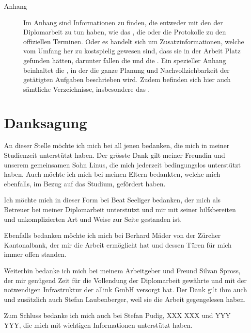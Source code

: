 \begin{description}
  \item[Anhang]
  
  Im Anhang sind Informationen zu finden, die entweder mit den
   der Diplomarbeit zu tun haben, wie das
  , die 
  oder die Protokolle zu den offiziellen Terminen. Oder es handelt sich um
  Zusatzinformationen, welche vom Umfang her zu kostspielig gewesen sind, dass
  sie in der Arbeit Platz gefunden hätten, darunter fallen die
   und die
  . Ein spezieller Anhang
  beinhaltet die , in der die ganze
  Planung und Nachvollziehbarkeit der getätigten Aufgaben beschrieben wird.
  Zudem befinden sich hier auch sämtliche Verzeichnisse, insbesondere das
  \bibname.
  
  \end{description}
  
  \section{Danksagung}
  
  An dieser Stelle möchte ich mich bei all jenen bedanken, die mich in meiner
  Studienzeit unterstützt haben. Der grösste Dank gilt meiner Freundin und
  unserem gemeinsamen Sohn Linus, die mich jederzeit bedingungslos unterstützt
  haben. Auch möchte ich mich bei meinen Eltern bedankten, welche mich
  ebenfalls, im Bezug auf das Studium, gefördert haben.
  
  Ich möchte mich in dieser Form bei Beat Seeliger bedanken, der mich als
  Betreuer bei meiner Diplomarbeit unterstützt und mir mit seiner hilfsbereiten
  und unkomplizierten Art und Weise zur Seite gestanden ist.
  
  Ebenfalls bedanken möchte ich mich bei Berhard Mäder von der Zürcher
  Kantonalbank, der mir die Arbeit ermöglicht hat und dessen Türen für mich
  immer offen standen.
  
  Weiterhin bedanke ich mich bei meinem Arbeitgeber und Freund Silvan Spross,
  der mir genügend Zeit für die Vollendung der Diplomarbeit gewährte und mit der
  notwendigen Infrastruktur der allink GmbH versorgt hat. Der Dank gilt
  ihm auch und zusätzlich auch Stefan Laubenberger, weil sie die Arbeit
  gegengelesen haben.
  
  Zum Schluss bedanke ich mich auch bei Stefan Pudig, XXX XXX und YYY YYY, die
  mich mit wichtigen Informationen unterstützt haben.
    